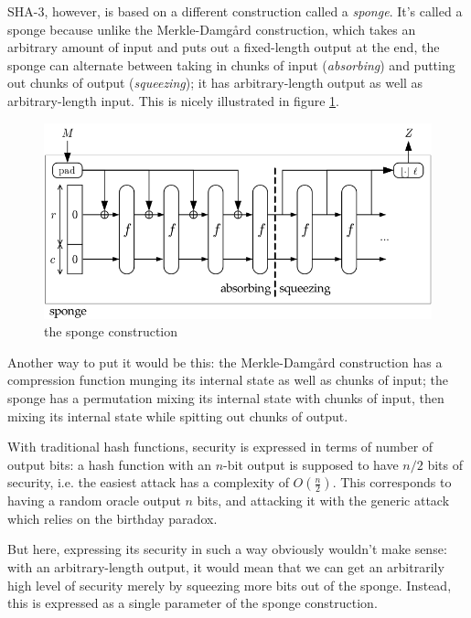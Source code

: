 \documentclass[times, utf8, diplomski]{fer}
\begin{document}
SHA-3, however, is based on a different construction called a \emph{sponge}.
It's called a sponge because unlike the Merkle-Damgård construction, which takes
an arbitrary amount of input and puts out a fixed-length output at the end, the
sponge can alternate between taking in chunks of input (\emph{absorbing}) and
putting out chunks of output (\emph{squeezing}); it has arbitrary-length output
as well as arbitrary-length input.
This is nicely illustrated in figure \ref{fig:sponge}.


\begin{figure}[htb]
    \centering
    \includegraphics{images/sponge.png}
    \caption{the sponge construction}
    \label{fig:sponge}
\end{figure}

Another way to put it would be this: the Merkle-Damgård construction has a
compression function munging its internal state as well as chunks of input;
the sponge has a permutation mixing its internal state with chunks of input,
then mixing its internal state while spitting out chunks of output.

With traditional hash functions, security is expressed in terms of number of
output bits: a hash function with an $n$-bit output is supposed to have $n/2$
bits of security, i.e. the easiest attack has a complexity of $O(\frac{n}{2})$.
This corresponds to having a random oracle output $n$ bits, and attacking it
with the generic attack which relies on the birthday paradox.

But here, expressing its security in such a way obviously wouldn't make sense:
with an arbitrary-length output, it would mean that we can get an arbitrarily
high level of security merely by squeezing more bits out of the sponge.
Instead, this is expressed as a single parameter of the sponge construction.
\end{document}
